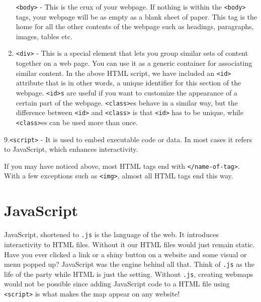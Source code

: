 \documentclass[
]{book}
\begin{document}
\begin{enumerate}
  \texttt{\textless{}body\textgreater{}} - This is the crux of your webpage. If nothing is within the \texttt{\textless{}body\textgreater{}} tags, your webpage will be as empty as a blank sheet of paper. This tag is the home for all the other contents of the webpage such as headings, paragraphs, images, tables etc.
\item
  \texttt{\textless{}div\textgreater{}} - This is a special element that lets you group similar sets of content together on a web page. You can use it as a generic container for associating similar content. In the above HTML script, we have included an \texttt{\textless{}id\textgreater{}} attribute that is in other words, a unique identifier for this section of the webpage. \texttt{\textless{}id\textgreater{}s} are useful if you want to customize the appearance of a certain part of the webpage. \texttt{\textless{}class\textgreater{}}es behave in a similar way, but the difference between \texttt{\textless{}id\textgreater{}} and \texttt{\textless{}class\textgreater{}} is that \texttt{\textless{}id\textgreater{}} has to be unique, while \texttt{\textless{}class\textgreater{}}es can be used more than once.
\end{enumerate}

9.\texttt{\textless{}script\textgreater{}} - It is used to embed executable code or data. In most cases it refers to JavaScript, which enhances interactivity.

If you may have noticed above, most HTML tags end with \texttt{\textless{}/name-of-tag\textgreater{}}. With a few exceptions such as \texttt{\textless{}img\textgreater{}}, almost all HTML tags end this way.

\hypertarget{javascript}{%
\section{JavaScript}\label{javascript}}

JavaScript, shortened to \texttt{.js} is the language of the web. It introduces interactivity to HTML files. Without it our HTML files would just remain static. Have you ever clicked a link or a shiny button on a website and some visual or menu popped up? JavaScript was the engine behind all that. Think of \texttt{.js} as the life of the party while HTML is just the setting. Without \texttt{.js}, creating webmaps would not be possible since adding JavaScript code to a HTML file using \texttt{\textless{}script\textgreater{}} is what makes the map appear on any website!
\end{document}
